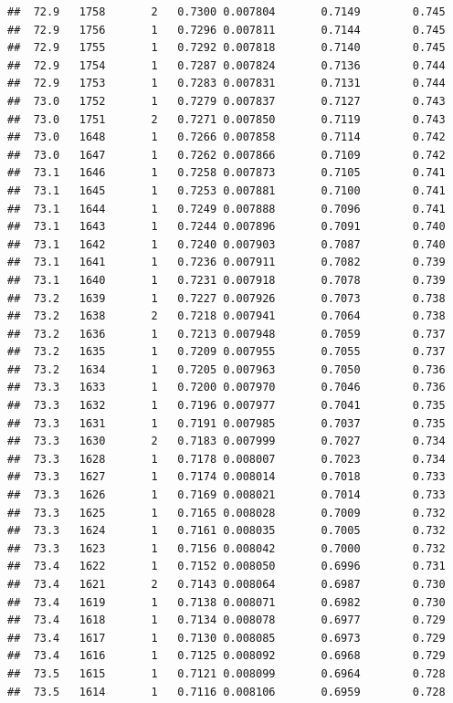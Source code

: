 \documentclass[
]{book}
\begin{document}
\begin{verbatim}
##  72.9   1758       2   0.7300 0.007804       0.7149        0.745
##  72.9   1756       1   0.7296 0.007811       0.7144        0.745
##  72.9   1755       1   0.7292 0.007818       0.7140        0.745
##  72.9   1754       1   0.7287 0.007824       0.7136        0.744
##  72.9   1753       1   0.7283 0.007831       0.7131        0.744
##  73.0   1752       1   0.7279 0.007837       0.7127        0.743
##  73.0   1751       2   0.7271 0.007850       0.7119        0.743
##  73.0   1648       1   0.7266 0.007858       0.7114        0.742
##  73.0   1647       1   0.7262 0.007866       0.7109        0.742
##  73.1   1646       1   0.7258 0.007873       0.7105        0.741
##  73.1   1645       1   0.7253 0.007881       0.7100        0.741
##  73.1   1644       1   0.7249 0.007888       0.7096        0.741
##  73.1   1643       1   0.7244 0.007896       0.7091        0.740
##  73.1   1642       1   0.7240 0.007903       0.7087        0.740
##  73.1   1641       1   0.7236 0.007911       0.7082        0.739
##  73.1   1640       1   0.7231 0.007918       0.7078        0.739
##  73.2   1639       1   0.7227 0.007926       0.7073        0.738
##  73.2   1638       2   0.7218 0.007941       0.7064        0.738
##  73.2   1636       1   0.7213 0.007948       0.7059        0.737
##  73.2   1635       1   0.7209 0.007955       0.7055        0.737
##  73.2   1634       1   0.7205 0.007963       0.7050        0.736
##  73.3   1633       1   0.7200 0.007970       0.7046        0.736
##  73.3   1632       1   0.7196 0.007977       0.7041        0.735
##  73.3   1631       1   0.7191 0.007985       0.7037        0.735
##  73.3   1630       2   0.7183 0.007999       0.7027        0.734
##  73.3   1628       1   0.7178 0.008007       0.7023        0.734
##  73.3   1627       1   0.7174 0.008014       0.7018        0.733
##  73.3   1626       1   0.7169 0.008021       0.7014        0.733
##  73.3   1625       1   0.7165 0.008028       0.7009        0.732
##  73.3   1624       1   0.7161 0.008035       0.7005        0.732
##  73.3   1623       1   0.7156 0.008042       0.7000        0.732
##  73.4   1622       1   0.7152 0.008050       0.6996        0.731
##  73.4   1621       2   0.7143 0.008064       0.6987        0.730
##  73.4   1619       1   0.7138 0.008071       0.6982        0.730
##  73.4   1618       1   0.7134 0.008078       0.6977        0.729
##  73.4   1617       1   0.7130 0.008085       0.6973        0.729
##  73.4   1616       1   0.7125 0.008092       0.6968        0.729
##  73.5   1615       1   0.7121 0.008099       0.6964        0.728
##  73.5   1614       1   0.7116 0.008106       0.6959        0.728

\end{verbatim}
\end{document}
